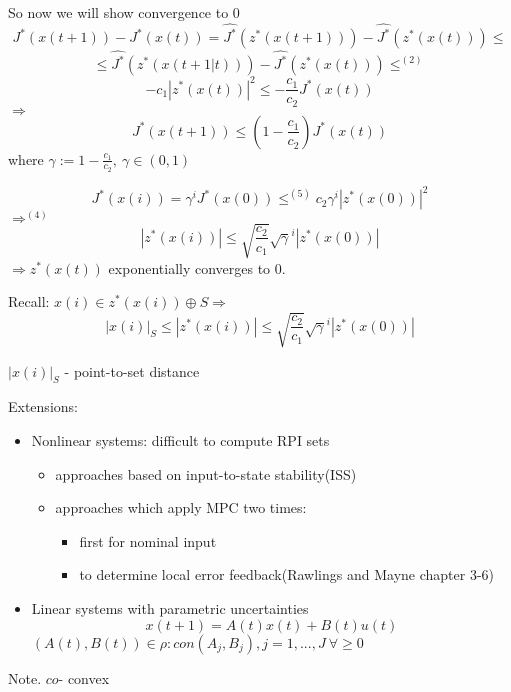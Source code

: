 So now we will show convergence to $0$
\begin{equation*}
J^*(x(t+1)) - J^*(x(t)) = \hat{J^*}(z^*(x(t+1))) - \hat{J^*}(z^*(x(t))) \leq
\end{equation*}
\begin{equation*}
\leq \hat{J^*}(z^*(x(t+1|t))) - \hat{J^*}(z^*(x(t))) \leq^{(2)}
\end{equation*}
\begin{equation*}
-c_1|z^*(x(t))|^2 \leq - \frac{c_1}{c_2}J^*(x(t))
\end{equation*}
$\Rightarrow$
\begin{equation*}
J^*(x(t+1)) \leq (1 - \frac{c_1}{c_2})J^*(x(t))
\end{equation*} 
where $\gamma := 1 - \frac{c_1}{c_2}, \ \gamma \in (0,1)$

\begin{equation*}
J^*(x(i)) = \gamma^iJ^*(x(0)) \leq^{(5)} c_2\gamma^i|z^*(x(0))|^2
\end{equation*}
$\Rightarrow^{(4)}$
\begin{equation*}
|z^*(x(i))| \leq \sqrt{\frac{c_2}{c_1}}\sqrt{\gamma}^i|z^*(x(0))|
\end{equation*}
$\Rightarrow z^*(x(t))$ exponentially converges to $0$.

Recall: $x(i) \in z^*(x(i)) \oplus S \Rightarrow$
\begin{equation*}
|x(i)|_S \leq |z^*(x(i))| \leq \sqrt{\frac{c_2}{c_1}}\sqrt{\gamma}^i|z^*(x(0))|
\end{equation*}

$|x(i)|_S$ - point-to-set distance

Extensions:
\begin{itemize}
\item Nonlinear systems: difficult to compute RPI sets
\begin{itemize}
\item approaches based on input-to-state stability(ISS)
\item approaches which apply MPC two times:
\begin{itemize}
\item first for nominal input
\item to determine local error feedback(Rawlings and Mayne chapter 3-6)
\end{itemize}
\end{itemize}
\item Linear systems with parametric uncertainties
\begin{equation*}
x(t+1) = A(t)x(t) + B(t)u(t)
\end{equation*}
$(A(t),B(t)) \in \rho : con{(A_j,B_j), j = 1,...,J} \ \forall \geq 0$ 
\end{itemize}
Note. $co$- convex

